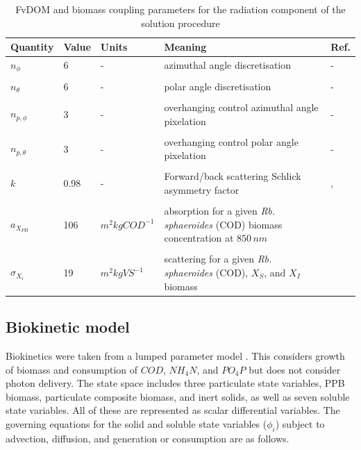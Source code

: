 \begin{table}[tp]
\caption{FvDOM and biomass coupling parameters for the radiation component of the solution procedure}
\centering
\label{tab:photoBioProperties}
\begin{tabular}{p{2.5cm} p{1.2cm}  p{2.3cm} p{4.5cm} p{1.3cm}}

\hline
\textbf{Quantity} & \textbf{Value} & \textbf{Units} & \textbf{Meaning} & \textbf{Ref.}\\ \hline
$n_\phi$ & 6 & - &azimuthal angle discretisation & - \\ \\
$n_\theta$ & 6 & - & polar angle discretisation & - \\ \\
$n_{p,\phi}$& 3 & - & overhanging control azimuthal angle pixelation & - \\ \\
$n_{p,\theta}$& 3 & - & overhanging control polar angle pixelation & -\\ \\
$k$ & 0.98 & - & Forward/back scattering Schlick asymmetry factor & \cite{jarosz2008}, \cite{berberoglu2007a}\\ \\ 
$a_{X_{PB}}$ & 106 & $m^2 kgCOD^{-1}$ & absorption for a given \textit{Rb. sphaeroides} (COD) biomass concentration at $850\, nm$ & \cite{berberoglu2007a}\\ \\
$\sigma_{X_{i}}$ & 19 & $m^2 kgVS^{-1}$ & scattering for a given \textit{Rb. sphaeroides} (COD), $X_S$, and $X_I$ biomass & \cite{berberoglu2007a}\\
\hline
\end{tabular}
\end{table}
\newpage
\subsection{Biokinetic model}
Biokinetics were taken from a lumped parameter model \cite{puyol2017}. This considers growth of biomass and consumption of $COD$, $NH_4N$, and $PO_4P$ but does not consider photon delivery. The state space includes three particulate state variables, PPB biomass, particulate composite biomass, and inert solids, as well as seven soluble state variables. All of these are represented as scalar differential variables. The governing equations for the solid and soluble state variables ($\phi_i$) subject to advection, diffusion, and generation or consumption are as follows.

